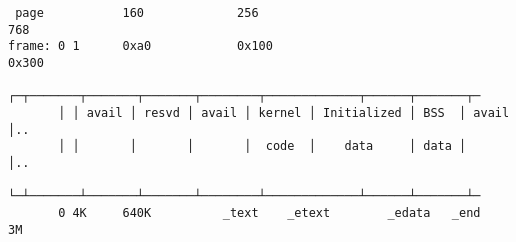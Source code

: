 \documentclass[varwidth=50em]{standalone}
\begin{document}
\begin{verbatim}
 page           160             256                                   768
frame: 0 1      0xa0            0x100                                0x300
       ┌─┬───────┬───────┬───────┬────────┬─────────────┬──────┬───────┬─
       │ │ avail │ resvd │ avail │ kernel │ Initialized │ BSS  │ avail │..
       │ │       │       │       │  code  │    data     │ data │       │..
       └─┴───────┴───────┴───────┴────────┴─────────────┴──────┴───────┴─
       0 4K     640K          _text    _etext        _edata   _end     3M
\end{verbatim}
\end{document}
